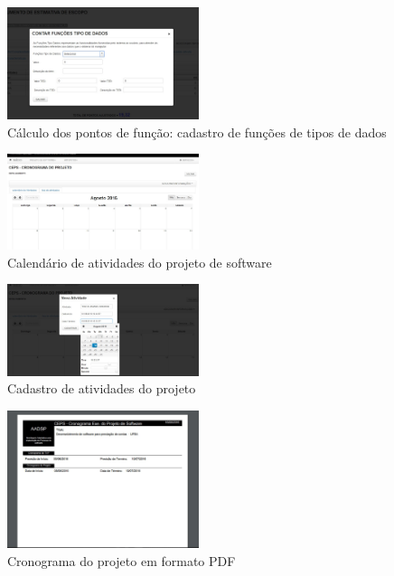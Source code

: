 \documentclass{acm_proc_article-sp}
\begin{document}
\begin{appendices}
\begin{figure}[h]
\centering %
\includegraphics[width=0.5\textwidth]{RF_funcoes_tipos_de_dados_estimativa_de_escopo.jpg} %
\caption{Cálculo dos pontos de função: cadastro de funções de tipos de dados}
\end{figure}

\begin{figure}[h]
\centering %
\includegraphics[width=0.5\textwidth]{RF_quadro_de_atividades_do_projeto.jpg} %
\caption{Calendário de atividades do projeto de software}
\end{figure}

\begin{figure}[h]
\centering %
\includegraphics[width=0.5\textwidth]{RF_cadastr_de_atividade_para_projeto.jpg} %
\caption{Cadastro de atividades do projeto}
\end{figure}

\begin{figure}[h]
\centering %
\includegraphics[width=0.5\textwidth]{RF_cronograma_do_projeto_PDF.jpg} %
\caption{Cronograma do projeto em formato PDF}
\end{figure}


\end{appendices}
\end{document}
